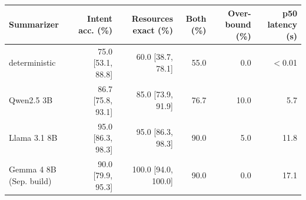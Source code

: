 \begin{tabular}{lrrrrr}
\toprule
Summarizer & Intent acc. (\%) & Resources exact (\%) & Both (\%) & Over-bound (\%) & p50 latency (s) \\
\midrule
deterministic & 75.0 {\scriptsize[53.1, 88.8]} & 60.0 {\scriptsize[38.7, 78.1]} & 55.0 & 0.0 & $<$0.01 \\
Qwen2.5 3B & 86.7 {\scriptsize[75.8, 93.1]} & 85.0 {\scriptsize[73.9, 91.9]} & 76.7 & 10.0 & 5.7 \\
Llama 3.1 8B & 95.0 {\scriptsize[86.3, 98.3]} & 95.0 {\scriptsize[86.3, 98.3]} & 90.0 & 5.0 & 11.8 \\
Gemma 4 8B (Sep. build) & 90.0 {\scriptsize[79.9, 95.3]} & 100.0 {\scriptsize[94.0, 100.0]} & 90.0 & 0.0 & 17.1 \\
\bottomrule
\end{tabular}
